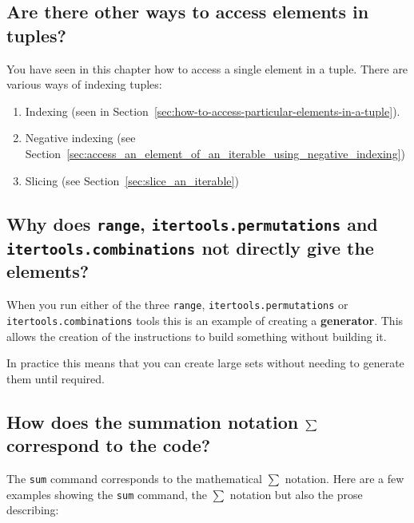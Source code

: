 \subsection{Are there other ways to access elements in tuples?}
\label{\detokenize{tools-for-mathematics/05-combinations-permutations/why/main:are-there-other-ways-to-access-elements-in-tuples}}

You have seen in this chapter how to access a single element in a tuple. There
are various ways of indexing tuples:
\begin{enumerate}

\item 

Indexing (seen in Section~\ref{sec:how-to-access-particular-elements-in-a-tuple}).

\item 

Negative indexing (see Section~\ref{sec:access_an_element_of_an_iterable_using_negative_indexing})

\item 

Slicing (see Section~\ref{sec:slice_an_iterable})

\end{enumerate}


\subsection{Why does \texttt{range}, \texttt{itertools.permutations} and \texttt{itertools.combinations} not directly give the elements?}

When you run either of the three \texttt{range}, \texttt{itertools.permutations} or
\texttt{itertools.combinations} tools this is an example of creating a \textbf{generator}.
This allows the creation of the instructions to build something without building
it.


In practice this means that you can create large sets without needing to generate
them until required.


\subsection{How does the summation notation \protect\(\sum\protect\) correspond to the code?}
\label{\detokenize{tools-for-mathematics/05-combinations-permutations/why/main:how-does-the-summation-notation-sum-correspond-to-the-code}}

The \texttt{sum} command corresponds to the mathematical
\(\sum\) notation. Here are a few examples showing the \texttt{sum} command,
the \(\sum\) notation but also the prose describing:

